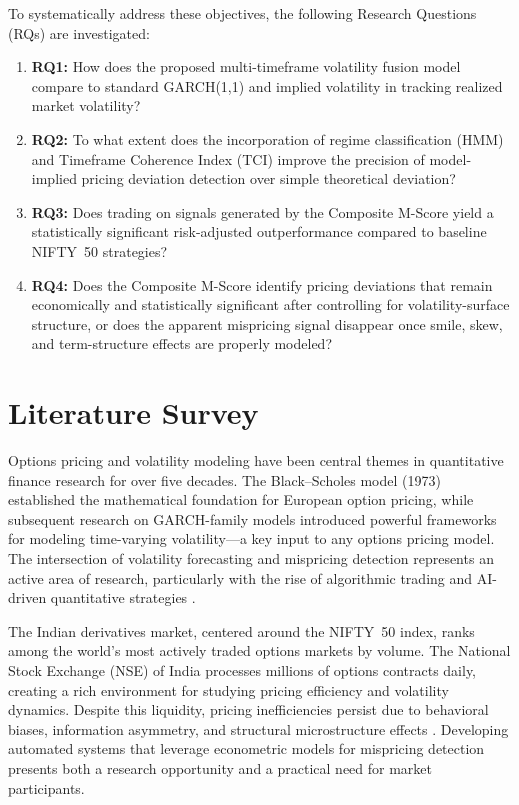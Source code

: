 \documentclass[journal]{IEEEtran}
\begin{document}
To systematically address these objectives, the following Research
Questions (RQs) are investigated:
\begin{enumerate}
  \item \textbf{RQ1:} How does the proposed multi-timeframe volatility
    fusion model compare to standard GARCH(1,1) and implied volatility
    in tracking realized market volatility?
  \item \textbf{RQ2:} To what extent does the incorporation of regime
    classification (HMM) and Timeframe Coherence Index (TCI) improve
    the precision of model-implied pricing deviation detection over
    simple theoretical deviation?
  \item \textbf{RQ3:} Does trading on signals generated by the
    Composite M-Score yield a statistically significant risk-adjusted
    outperformance compared to baseline NIFTY~50 strategies?
  \item \textbf{RQ4:} Does the Composite M-Score identify pricing
    deviations that remain economically and statistically significant
    after controlling for volatility-surface structure, or does the
    apparent mispricing signal disappear once smile, skew, and
    term-structure effects are properly modeled?
\end{enumerate}

\section{Literature Survey}

Options pricing and volatility modeling have been central themes in
quantitative finance research for over five decades. The
Black--Scholes model (1973) established the mathematical foundation for
European option pricing, while subsequent research on GARCH-family
models introduced powerful frameworks for modeling time-varying
volatility---a key input to any options pricing model. The intersection
of volatility forecasting and mispricing detection represents an active
area of research, particularly with the rise of algorithmic trading and
AI-driven quantitative strategies \cite{duan1995,glasserman2004}.

The Indian derivatives market, centered around the NIFTY~50 index,
ranks among the world's most actively traded options markets by volume.
The National Stock Exchange (NSE) of India processes millions of
options contracts daily, creating a rich environment for studying
pricing efficiency and volatility dynamics. Despite this liquidity,
pricing inefficiencies persist due to behavioral biases, information
asymmetry, and structural microstructure effects
\cite{kim2023,foster2024}. Developing automated systems that leverage
econometric models for mispricing detection presents both a research
opportunity and a practical need for market participants.
\end{document}
